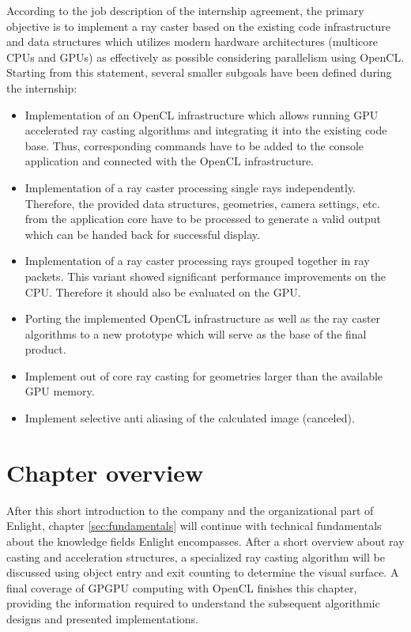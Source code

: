 According to the job description of the internship agreement, the primary objective is to implement a ray caster based on the existing code infrastructure and data structures which utilizes modern hardware architectures (multicore CPUs and GPUs) as effectively as possible considering parallelism using OpenCL. Starting from this statement, several smaller subgoals have been defined during the internship:

\begin{itemize}
	\item Implementation of an OpenCL infrastructure which allows running GPU accelerated ray casting algorithms and integrating it into the existing code base. Thus, corresponding commands have to be added to the console application and connected with the OpenCL infrastructure.
	
	\pagebreak
	
	\item Implementation of a ray caster processing single rays independently. Therefore, the provided data structures, geometries, camera settings, etc. from the application core have to be processed to generate a valid output which can be handed back for successful display.
	
	\item Implementation of a ray caster processing rays grouped together in ray packets. This variant showed significant performance improvements on the CPU. Therefore it should also be evaluated on the GPU.
	
	\item Porting the implemented OpenCL infrastructure as well as the ray caster algorithms to a new prototype which will serve as the base of the final product.
	
	\item Implement out of core ray casting for geometries larger than the available GPU memory.
	
	\item Implement selective anti aliasing of the calculated image (canceled).
\end{itemize}


\section{Chapter overview}

After this short introduction to the company and the organizational part of Enlight,  chapter \ref{sec:fundamentals} will continue with technical fundamentals about the knowledge fields Enlight encompasses. After a short overview about ray casting and acceleration structures, a specialized ray casting algorithm will be discussed using object entry and exit counting to determine the visual surface. A final coverage of GPGPU computing with OpenCL finishes this chapter, providing the information required to understand the subsequent algorithmic designs and presented implementations.

